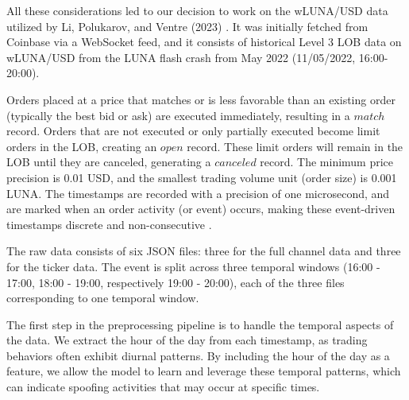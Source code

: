 \documentclass[conference]{IEEEtran}
\begin{document}
\par All these considerations led to our decision to work on the wLUNA/USD data utilized by Li, Polukarov, and Ventre (2023) \cite{Li_2023}. It was initially fetched from Coinbase via a WebSocket feed, and it consists of historical Level 3 LOB data on wLUNA/USD from the LUNA flash crash from May 2022 (11/05/2022, 16:00-20:00).

\par Orders placed at a price that matches or is less favorable than an existing order (typically the best bid or ask) are executed immediately, resulting in a $match$ record. Orders that are not executed or only partially executed become limit orders in the LOB, creating an $open$ record. These limit orders will remain in the LOB until they are canceled, generating a $canceled$ record. The minimum price precision is 0.01 USD, and the smallest trading volume unit (order size) is 0.001 LUNA. The timestamps are recorded with a precision of one microsecond, and are marked when an order activity (or event) occurs, making these event-driven timestamps discrete and non-consecutive \cite{Li_2023}.

\par The raw data consists of six JSON files: three for the full channel data and three for the ticker data. The event is split across three temporal windows (16:00 - 17:00, 18:00 - 19:00, respectively 19:00 - 20:00), each of the three files corresponding to one temporal window.

\par The first step in the preprocessing pipeline is to handle the temporal aspects of the data. We extract the hour of the day from each timestamp, as trading behaviors often exhibit diurnal patterns. By including the hour of the day as a feature, we allow the model to learn and leverage these temporal patterns, which can indicate spoofing activities that may occur at specific times.
\end{document}
